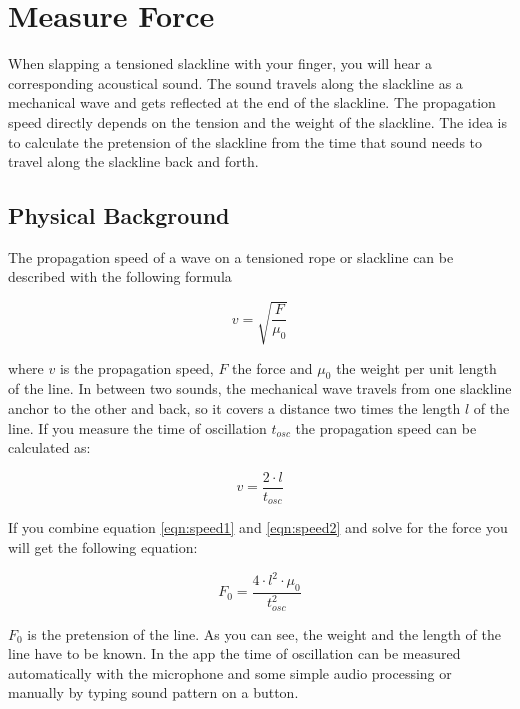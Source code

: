
\chapter{Measure Force}

When slapping a tensioned slackline with your finger, you will hear a corresponding acoustical sound. The sound travels along the slackline as a mechanical wave and gets reflected at the end of the slackline. The propagation speed directly depends on the tension and the weight of the slackline. The idea is to calculate the pretension of the slackline from the time that sound needs to travel along the slackline back and forth. 

\section{Physical Background}

The propagation speed of a wave on a tensioned rope or slackline can be described with the following formula

\begin{equation}
v = \sqrt{\frac{F}{\mu_0}}
\label{eqn:speed1}
\end{equation}

where $v$ is the propagation speed, $F$ the force and $\mu_0$ the weight per unit length of the line. In between two sounds, the mechanical wave travels from one slackline anchor to the other and back, so it covers a distance two times the length $l$ of the line. If you measure the time of oscillation $t_{osc}$ the propagation speed can be calculated as:

\begin{equation}
	v = \frac{2\cdot l}{t_{osc}}
	\label{eqn:speed2}
\end{equation}

If you combine equation \ref{eqn:speed1} and \ref{eqn:speed2} and solve for the force you will get the following equation:

\begin{equation}
	F_0 = \frac{4\cdot l^2\cdot \mu_0}{t_{osc}^2}
	\label{eqn:measureForce}
\end{equation}

$F_0$ is the pretension of the line. As you can see, the weight and the length of the line have to be known. In the app the time of oscillation can be measured automatically with the microphone and some simple audio processing or manually by typing sound pattern on a button.

